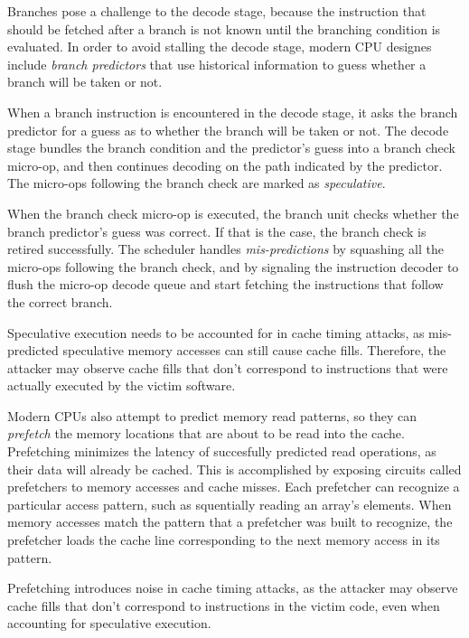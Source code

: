 Branches pose a challenge to the decode stage, because the instruction that
should be fetched after a branch is not known until the branching condition is
evaluated. In order to avoid stalling the decode stage, modern CPU designes
include \textit{branch predictors} that use historical information to guess
whether a branch will be taken or not.

When a branch instruction is encountered in the decode stage, it asks the
branch predictor for a guess as to whether the branch will be taken or not. The
decode stage bundles the branch condition and the predictor's guess into a
branch check micro-op, and then continues decoding on the path indicated by the
predictor. The micro-ops following the branch check are marked as
\textit{speculative}.

When the branch check micro-op is executed, the branch unit checks whether the
branch predictor's guess was correct. If that is the case, the branch check is
retired successfully. The scheduler handles \textit{mis-predictions} by
squashing all the micro-ops following the branch check, and by signaling the
instruction decoder to flush the micro-op decode queue and start fetching the
instructions that follow the correct branch.

Speculative execution needs to be accounted for in cache timing attacks, as
mis-predicted speculative memory accesses can still cause cache fills.
Therefore, the attacker may observe cache fills that don't correspond to
instructions that were actually executed by the victim software.


Modern CPUs also attempt to predict memory read patterns, so they can
\textit{prefetch} the memory locations that are about to be read into the
cache. Prefetching minimizes the latency of succesfully predicted read
operations, as their data will already be cached. This is accomplished by
exposing circuits called prefetchers to memory accesses and cache misses. Each
prefetcher can recognize a particular access pattern, such as squentially
reading an array's elements. When memory accesses match the pattern that a
prefetcher was built to recognize, the prefetcher loads the cache line
corresponding to the next memory access in its pattern.

Prefetching introduces noise in cache timing attacks, as the attacker may
observe cache fills that don't correspond to instructions in the victim code,
even when accounting for speculative execution.
